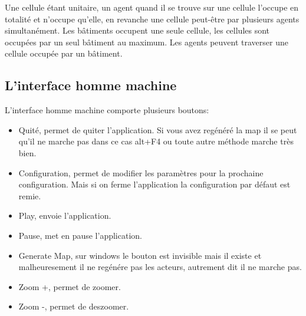 \documentclass[12pt]{article}
\begin{document}
Une cellule étant unitaire, un agent quand il se trouve sur une cellule 
l'occupe en totalité et n'occupe qu'elle, en revanche une cellule peut-être 
par plusieurs agents simultanément. Les bâtiments occupent une seule cellule, 
les cellules sont occupées par un seul bâtiment au maximum. Les agents peuvent 
traverser une cellule occupée par un bâtiment.

	\subsection{L'interface homme machine}
	
L'interface homme machine comporte plusieurs boutons:

	\begin{itemize}
	De gauche à droite:
		\item Quité, permet de quiter l'application. Si vous avez regénéré la map 
	il se peut qu'il ne marche pas dans ce cas alt+F4 ou toute autre méthode marche très bien.
		\item Configuration, permet de modifier les paramètres pour la prochaine configuration. Mais si on ferme l'application la configuration par défaut est remie.
		\item Play, envoie l'application.
		\item Pause, met en pause l'application.
		\item Generate Map, sur windows le bouton est invisible mais il existe et malheuresement il ne regénére pas les acteurs, autrement dit il ne marche pas.
		\item Zoom +, permet de zoomer.
		\item Zoom -, permet de deszoomer.
	\end{itemize}
	
\end{document}
